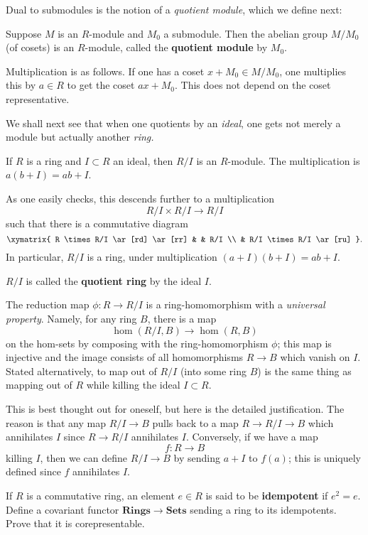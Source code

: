Dual to submodules  is the notion of a \emph{quotient module}, which we define
next:
\begin{definition} Suppose $M$ is an $R$-module and $M_0$  a
submodule.  Then the abelian group $M/M_0$ (of cosets)  is an $R$-module,
called the \textbf{quotient module} by $M_0$.  

Multiplication is as follows. If
one has a coset $x  + M_0 \in M/M_0$, one  multiplies this by $a \in R$ to
get the coset $ax
+ M_0$. This does not depend on the coset representative.  
\end{definition} 

We shall next see that when one quotients by an \emph{ideal}, one gets not
merely a module but actually another \emph{ring.}


\begin{example} 
If $R$ is a ring and $I \subset R$ an ideal, then $R/I$ is an $R$-module. The
multiplication is $a(b+I) = ab + I$. 

As one easily checks, this descends further to a multiplication 
\[ R/I \times R/I \to R/I  \] such that there is a commutative diagram
\[ \xymatrix{
R \times R/I \ar[rd] \ar[rr] & &  R/I \\
& R/I \times R/I \ar[ru] 
}.\]
In particular, $R/I$ is a ring, under multiplication $(a+I)(b+I) = ab+I$. 
\begin{definition} 
$R/I$ is called the \textbf{quotient ring} by the ideal $I$.
\end{definition} 

The
reduction map $\phi \colon R \to R/I$ is a ring-homomorphism with a
\emph{universal
property}.
Namely, for any ring $B$, there is a map
 \[ \hom(R/I, B) \to \hom(R, B)  \]
 on the hom-sets
 by composing with the ring-homomorphism $\phi$; this map is injective and the
 image consists of all homomorphisms $R \to B$ which vanish on $I$.  
Stated alternatively, to map out of $R/I$ (into some ring $B$) is the same thing as mapping out of
$R$ while killing the ideal $I \subset R$.

This is best thought out for oneself, but here is the detailed justification.
The reason is that any map $R/I \to B$ pulls back to a map $R \to R/I \to B$
which annihilates $I$ since $R \to R/I$ annihilates $I$. Conversely, if we have
a map 
\[ f: R \to B  \]
killing $I$, then we can define $R/I \to B$ by sending $a+I$ to $f(a)$; this is
uniquely defined since $f$ annihilates $I$.
\end{example} 

\begin{exercise} 
 If $R$ is a commutative
ring, an element $e \in R$ is said to be \textbf{idempotent} if $e^2 =
e$. Define a covariant functor $\mathbf{Rings} \to \mathbf{Sets}$ sending a
ring to its idempotents. Prove that it is corepresentable.
\end{exercise} 

